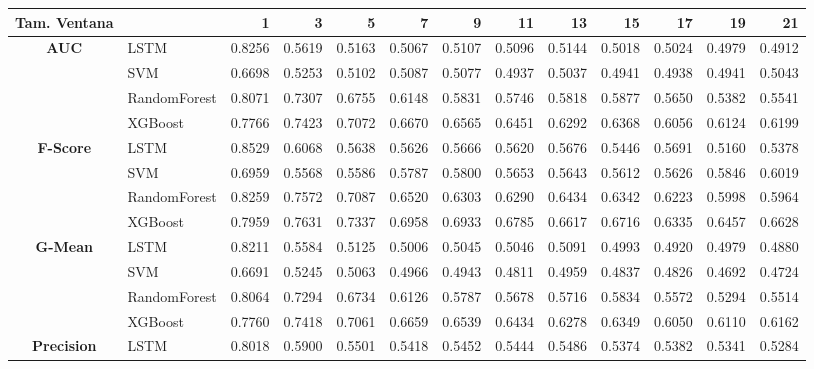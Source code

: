 \begin{table}[h]
	\centering
	\begin{adjustbox}{max width=15cm}
		\begin{tabular}{|c|l|r|r|r|r|r|r|r|r|r|r|r|}
			\hline
			\textbf{Tam. Ventana}&         &      1  &      3  &      5  &      7  &      9  &      11 &      13 &      15 &      17 &      19 &      21 \\
			\hline
			\textbf{AUC} & LSTM &  0.8256 &  0.5619 &  0.5163 &  0.5067 &  0.5107 &  0.5096 &  0.5144 &  0.5018 &  0.5024 &  0.4979 &  0.4912 \\
			& SVM &  0.6698 &  0.5253 &  0.5102 &  0.5087 &  0.5077 &  0.4937 &  0.5037 &  0.4941 &  0.4938 &  0.4941 &  0.5043 \\
			& RandomForest &  0.8071 &  0.7307 &  0.6755 &  0.6148 &  0.5831 &  0.5746 &  0.5818 &  0.5877 &  0.5650 &  0.5382 &  0.5541 \\
			& XGBoost &  0.7766 &  0.7423 &  0.7072 &  0.6670 &  0.6565 &  0.6451 &  0.6292 &  0.6368 &  0.6056 &  0.6124 &  0.6199 \\
			\hline
			\textbf{F-Score} & LSTM &  0.8529 &  0.6068 &  0.5638 &  0.5626 &  0.5666 &  0.5620 &  0.5676 &  0.5446 &  0.5691 &  0.5160 &  0.5378 \\
			& SVM &  0.6959 &  0.5568 &  0.5586 &  0.5787 &  0.5800 &  0.5653 &  0.5643 &  0.5612 &  0.5626 &  0.5846 &  0.6019 \\
			& RandomForest &  0.8259 &  0.7572 &  0.7087 &  0.6520 &  0.6303 &  0.6290 &  0.6434 &  0.6342 &  0.6223 &  0.5998 &  0.5964 \\
			& XGBoost &  0.7959 &  0.7631 &  0.7337 &  0.6958 &  0.6933 &  0.6785 &  0.6617 &  0.6716 &  0.6335 &  0.6457 &  0.6628 \\
			\hline
			\textbf{G-Mean} & LSTM &  0.8211 &  0.5584 &  0.5125 &  0.5006 &  0.5045 &  0.5046 &  0.5091 &  0.4993 &  0.4920 &  0.4979 &  0.4880 \\
			& SVM &  0.6691 &  0.5245 &  0.5063 &  0.4966 &  0.4943 &  0.4811 &  0.4959 &  0.4837 &  0.4826 &  0.4692 &  0.4724 \\
			& RandomForest &  0.8064 &  0.7294 &  0.6734 &  0.6126 &  0.5787 &  0.5678 &  0.5716 &  0.5834 &  0.5572 &  0.5294 &  0.5514 \\
			& XGBoost &  0.7760 &  0.7418 &  0.7061 &  0.6659 &  0.6539 &  0.6434 &  0.6278 &  0.6349 &  0.6050 &  0.6110 &  0.6162 \\
			\hline
			\textbf{Precision} & LSTM &  0.8018 &  0.5900 &  0.5501 &  0.5418 &  0.5452 &  0.5444 &  0.5486 &  0.5374 &  0.5382 &  0.5341 &  0.5284 \\

\end{tabular}
\end{adjustbox}
\end{table}

